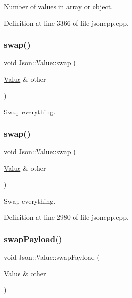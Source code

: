 Number of values in array or object. 



Definition at line 3366 of file jsoncpp.\+cpp.

\hypertarget{class_json_1_1_value_aab841120d78e296e1bc06a373345e822}{}\label{class_json_1_1_value_aab841120d78e296e1bc06a373345e822} 
\subsubsection{\texorpdfstring{swap()}{swap()}\hspace{0.1cm}{\footnotesize\ttfamily [1/2]}}
{\footnotesize\ttfamily void Json\+::\+Value\+::swap (\begin{DoxyParamCaption}\item[{\hyperlink{class_json_1_1_value}{Value} \&}]{other }\end{DoxyParamCaption})}



Swap everything. 

\hypertarget{class_json_1_1_value_aab841120d78e296e1bc06a373345e822}{}\label{class_json_1_1_value_aab841120d78e296e1bc06a373345e822} 
\subsubsection{\texorpdfstring{swap()}{swap()}\hspace{0.1cm}{\footnotesize\ttfamily [2/2]}}
{\footnotesize\ttfamily void Json\+::\+Value\+::swap (\begin{DoxyParamCaption}\item[{\hyperlink{class_json_1_1_value}{Value} \&}]{other }\end{DoxyParamCaption})}



Swap everything. 



Definition at line 2980 of file jsoncpp.\+cpp.

\hypertarget{class_json_1_1_value_a5263476047f20e2fc6de470e4de34fe5}{}\label{class_json_1_1_value_a5263476047f20e2fc6de470e4de34fe5} 
\subsubsection{\texorpdfstring{swap\+Payload()}{swapPayload()}\hspace{0.1cm}{\footnotesize\ttfamily [1/2]}}
{\footnotesize\ttfamily void Json\+::\+Value\+::swap\+Payload (\begin{DoxyParamCaption}\item[{\hyperlink{class_json_1_1_value}{Value} \&}]{other }\end{DoxyParamCaption})}



